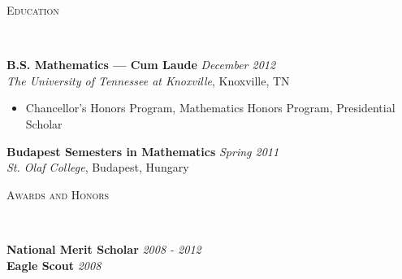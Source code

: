 \documentclass[10pt]{article}
\newenvironment{changemargin}[2]{%
  \begin{list}{}{%
    \setlength{\topsep}{0pt}%
    \setlength{\leftmargin}{#1}%
    \setlength{\rightmargin}{#2}%
    \setlength{\listparindent}{\parindent}%
    \setlength{\itemindent}{\parindent}%
    \setlength{\parsep}{\parskip}%
  }%
  \item[]}{\end{list}
}
\newcommand{\lineover}{
	\begin{changemargin}{-0.05in}{-0.05in}
		\vspace*{-8pt}
		\hrulefill \\
		\vspace*{-2pt}
	\end{changemargin}
}
\newcommand{\header}[1]{
	\begin{changemargin}{-0.5in}{-0.5in}
		\scshape{#1}\\
  	\lineover
	\end{changemargin}
}
\newenvironment{body} {
	\vspace*{-16pt}
	\begin{changemargin}{-0.25in}{-0.5in}
  }	
	{\end{changemargin}
}
\begin{document}
\smallskip


\header{Education}

\begin{body}
	\vspace{14pt}
	\textbf{B.S. Mathematics --- Cum Laude} \hfill \emph{December 2012} \\
	\emph{The University of Tennessee at Knoxville}, Knoxville, TN\\
    \begin{itemize}
    \item Chancellor's Honors Program, Mathematics Honors Program, Presidential Scholar\\
    \end{itemize}
    \smallskip
	\textbf{Budapest Semesters in Mathematics} \hfill \emph{Spring 2011} \\
	\emph{St. Olaf College}, Budapest, Hungary\\
\end{body}
\smallskip

\header{Awards and Honors}

\begin{body}
	\vspace{14pt}
	\textbf{National Merit Scholar} \hfill{} \emph{2008 - 2012} \\
	\smallskip
	\textbf{Eagle Scout} \hfill{} \emph{2008}
\end{body}
\end{document}
